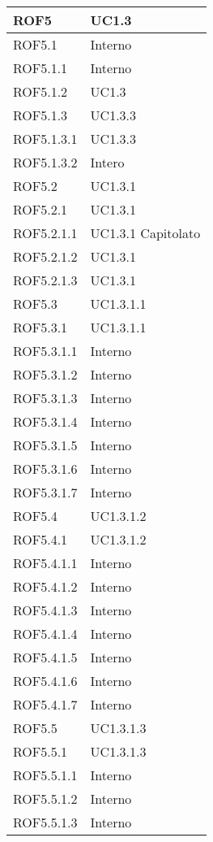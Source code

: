 \begin{center}
\begin{longtable}{| p{4cm} | p{4cm} |}
\hline
ROF5   &  UC1.3 \\
\hline
ROF5.1   &  Interno \\
\hline
ROF5.1.1   &  Interno \\
\hline
ROF5.1.2   &  UC1.3 \\
\hline
ROF5.1.3   &  UC1.3.3 \\
\hline
ROF5.1.3.1   &  UC1.3.3 \\
\hline
ROF5.1.3.2   &  Intero \\
\hline
ROF5.2   &  UC1.3.1 \\
\hline
ROF5.2.1   &  UC1.3.1 \\
\hline
ROF5.2.1.1   &  UC1.3.1 \newline Capitolato \\
\hline
ROF5.2.1.2   &  UC1.3.1 \\
\hline
ROF5.2.1.3   &  UC1.3.1 \\
\hline
ROF5.3   &  UC1.3.1.1 \\
\hline
ROF5.3.1   &  UC1.3.1.1  \\
\hline
ROF5.3.1.1   &  Interno \\
\hline
ROF5.3.1.2   &  Interno \\
\hline
ROF5.3.1.3   &  Interno \\
\hline
ROF5.3.1.4   &  Interno \\
\hline
ROF5.3.1.5   &  Interno \\
\hline
ROF5.3.1.6   &  Interno \\
\hline
ROF5.3.1.7   &  Interno \\
\hline
ROF5.4   &  UC1.3.1.2  \\
\hline
ROF5.4.1   &  UC1.3.1.2  \\
\hline
ROF5.4.1.1   &  Interno \\
\hline
ROF5.4.1.2   &  Interno \\
\hline
ROF5.4.1.3   &  Interno \\
\hline
ROF5.4.1.4   &  Interno \\
\hline
ROF5.4.1.5   &  Interno \\
\hline
ROF5.4.1.6   &  Interno \\
\hline
ROF5.4.1.7   &  Interno \\
\hline
ROF5.5   &  UC1.3.1.3  \\
\hline
ROF5.5.1   &  UC1.3.1.3 \\
\hline
ROF5.5.1.1   &  Interno \\
\hline
ROF5.5.1.2   &  Interno \\
\hline
ROF5.5.1.3   &  Interno \\

\end{longtable}
\end{center}
